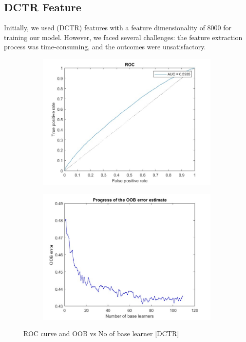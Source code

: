 \subsection{DCTR Feature}
Initially, we used (DCTR) features with a feature dimensionality of 8000 for training our model. However, we faced several challenges: the feature extraction process was time-consuming, and the outcomes were unsatisfactory.\\
\begin{figure}[H]
    \begin{subfigure}[b]{0.5\textwidth}
        \includegraphics[width=\textwidth]{img/rocdctr.jpg}
    \end{subfigure}
    \hfill
    \begin{subfigure}[b]{0.5\textwidth}
        \includegraphics[width=\textwidth]{img/saturationdctr.jpg}
    \end{subfigure}
    \caption{ROC curve and OOB vs No of base learner [DCTR]}
\end{figure}


